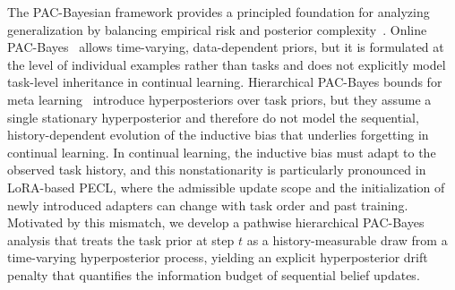 \documentclass{article}
\theoremstyle{plain}
\theoremstyle{definition}
\theoremstyle{remark}
\begin{document}
The PAC-Bayesian framework provides a principled foundation for analyzing generalization by balancing empirical risk and posterior complexity~\cite{mcallesterPACBayesianStochasticModel2003,pentinaPACBayesianBoundLifelong2014,germainPACBayesianTheoryMeets2016,lotfiPACBayesCompressionBounds2022}.
Online PAC-Bayes~\citep{NEURIPS2022_onlineBayes,NEURIPS2024_xinrui} allows time-varying, data-dependent priors, but it is formulated at the level of individual examples rather than tasks and does not explicitly model task-level inheritance in continual learning.
Hierarchical PAC-Bayes bounds for meta learning~\citep{pentinaPACBayesianBoundLifelong2014,JMLR:v24:22-1254} introduce hyperposteriors over task priors, but they assume a single stationary hyperposterior and therefore do not model the sequential, history-dependent evolution of the inductive bias that underlies forgetting in continual learning.
In continual learning, the inductive bias must adapt to the observed task history, and this nonstationarity is particularly pronounced in LoRA-based PECL, where the admissible update scope and the initialization of newly introduced adapters can change with task order and past training.
Motivated by this mismatch, we develop a pathwise hierarchical PAC-Bayes analysis that treats the task prior at step $t$ as a history-measurable draw from a time-varying hyperposterior process, yielding an explicit hyperposterior drift penalty that quantifies the information budget of sequential belief updates.
\end{document}
